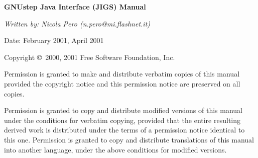 %
%
%
\begin{titlepage}
\begin{flushleft}
{\phantom{begin page}}
\vskip6cm

{\LARGE\bf GNUstep Java Interface (JIGS) Manual\par}

\vskip1cm

{\sl Written by:  Nicola Pero (n.pero@mi.flashnet.it)

Date: February 2001, April 2001}
\end{flushleft}

\vskip3cm

{\sc Copyright \copyright\ 2000, 2001 Free Software Foundation, Inc.}

Permission is granted to make and distribute verbatim copies of this
manual provided the copyright notice and this permission notice are
preserved on all copies.

Permission is granted to copy and distribute modified versions of this
manual under the conditions for verbatim copying, provided that the
entire resulting derived work is distributed under the terms of a
permission notice identical to this one.  Permission is granted to
copy and distribute translations of this manual into another language,
under the above conditions for modified versions.

\end{titlepage}





